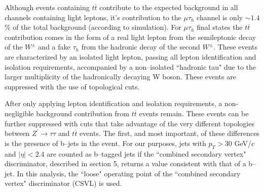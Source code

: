 Although events containing $t\overline{t}$ contribute to the expected background in all channels containing light leptons, it's contribution to the $\mu\tau_{h}$ 
channel is only $\sim 1.4$\% of the total background (according to simulation). For $\mu\tau_{h}$ final states the 
$t\overline{t}$ contribution comes in the form of a real light lepton from the semileptonic decay of the
$W^\pm$ and a fake $\tau_{h}$ from the hadronic decay of the second $W^\pm$. These events are characterized by an isolated light lepton, passing all lepton 
identification and isolation requirements, accompanied by a non--isolated ``hadronic tau" due to the
larger multiplicity of the hadronically decaying W boson. 
These events are suppressed with the use of topological cuts.

After only applying lepton identification and isolation requirements, a non-negligible background contribution from $t\overline{t}$ events remain. These events 
can be further suppressed with cuts that take advantage of the very different topologies between $Z^\prime\to\tau\tau$ and $t\overline{t}$ events. The first, and most 
important, of these differences is the presence of b--jets in the event. 
For our purposes, jets with 
$p_{T} > 30$ GeV/$c$ and $|\eta| < 2.4$ are counted as b--tagged jets if the ``combined secondary vertex" discriminator, described in section 5, 
returns a value consistent with that of a b--jet. 
In this analysis, the ``loose" operating point of the ``combined secondary vertex" 
discriminator (CSVL) is used. 

